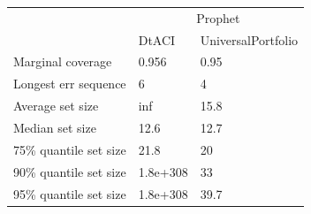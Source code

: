 \begin{tabular}{lll}
\toprule
& \multicolumn{2}{c}{Prophet} \\
& DtACI & UniversalPortfolio \\
\midrule
Marginal coverage & 0.956 & 0.95 \\
Longest err sequence & 6 & 4 \\
Average set size & inf & 15.8 \\
Median set size & 12.6 & 12.7 \\
75\% quantile set size & 21.8 & 20 \\
90\% quantile set size & 1.8e+308 & 33 \\
95\% quantile set size & 1.8e+308 & 39.7 \\
\bottomrule
\end{tabular}
